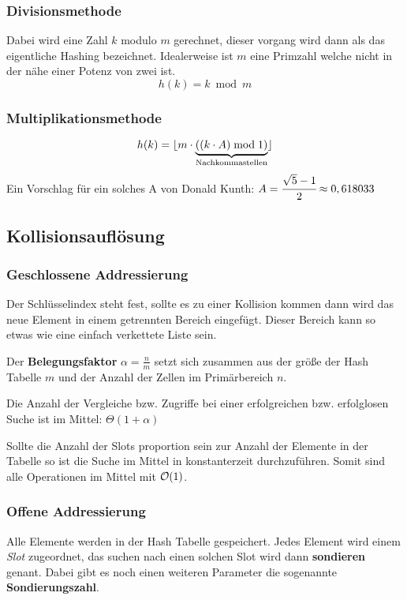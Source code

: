 \documentclass[10pt,a4paper]{article}
\begin{document}
\begin{multicols*}{4}
\subsubsection{Divisionsmethode}
Dabei wird eine Zahl \(k\) modulo \(m\) gerechnet, dieser vorgang wird dann als das eigentliche Hashing bezeichnet.
Idealerweise ist \(m\) eine Primzahl welche nicht in der nähe einer Potenz von zwei ist. \[h(k) = k \bmod m\]

\subsubsection{Multiplikationsmethode}
\[h(k) = \lfloor m \cdot \underbrace{\left((k \cdot A) \bmod 1\right)}_\text{Nachkommastellen}\rfloor\]
Ein Vorschlag für ein solches A von Donald Kunth: \(A = \cfrac{\sqrt{5}-1}{2} \approx 0,618033\)

\subsection{Kollisionsauflösung}

\subsubsection{Geschlossene Addressierung}
Der Schlüsselindex steht fest, sollte es zu einer Kollision kommen dann wird das neue Element in einem getrennten
Bereich eingefügt. Dieser Bereich kann so etwas wie eine einfach verkettete Liste sein.

Der \textbf{Belegungsfaktor} \(\alpha =\frac{n}{m}\) setzt sich zusammen aus der größe der Hash Tabelle \(m\) und der Anzahl
der Zellen im Primärbereich \(n\).

Die Anzahl der Vergleiche bzw. Zugriffe bei einer erfolgreichen bzw. erfolglosen Suche ist im Mittel:
\(\Theta(1+\alpha)\)

Sollte die Anzahl der Slots proportion sein zur Anzahl der Elemente in der Tabelle so ist die Suche im Mittel in
konstanterzeit durchzuführen. Somit sind alle Operationen im Mittel mit \(\mathcal{O}(1)\).

\subsubsection{Offene Addressierung}
Alle Elemente werden in der Hash Tabelle gespeichert. Jedes Element wird einem \emph{Slot} zugeordnet, das suchen nach
einen solchen Slot wird dann \textbf{sondieren} genant. Dabei gibt es noch einen weiteren Parameter die sogenannte
\textbf{Sondierungszahl}.


\end{multicols*}
\end{document}
